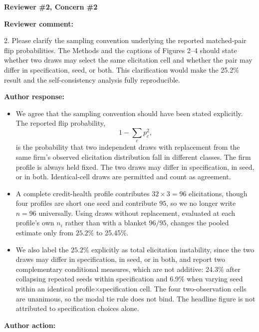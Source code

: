 \documentclass[11pt]{article}
\newcommand{\rvcomment}[1]{{\color{ReviewerGreen}#1}}
\newcommand{\concern}[1]{\textbf{\color{ReviewerGreen}#1}}
\begin{document}
\vspace{4pt}

\concern{Reviewer \#2, Concern \#2}

\concern{Reviewer comment:}

\rvcomment{2. Please clarify the sampling convention underlying the reported matched-pair flip
probabilities. The Methods and the captions of Figures 2--4 should state whether two draws may
select the same elicitation cell and whether the pair may differ in specification, seed, or both.
This clarification would make the 25.2\% result and the self-consistency analysis fully
reproducible.}

\textbf{Author response:}

\begin{itemize}
\item We agree that the sampling convention should have been stated explicitly. The reported flip
probability,
\[
1-\sum_c p_c^2,
\]
is the probability that two independent draws with replacement from the same firm's observed
elicitation distribution fall in different classes. The firm profile is always held fixed. The two draws may differ in
specification, in seed, or in both. Identical-cell draws are permitted and count as agreement.
\item A complete credit-health profile contributes $32\times3=96$ elicitations, though four profiles are short one seed and contribute $95$, so we no longer write $n=96$ universally. Using draws without replacement, evaluated at each profile's own $n_i$ rather than with a blanket $96/95$, changes the pooled estimate only from $25.2\%$ to 25.45\%.
\item We also label the $25.2\%$ explicitly as total elicitation instability, since the two draws may differ in specification, in seed, or in both, and report two complementary conditional measures, which are not additive: 24.3\% after collapsing repeated seeds within specification and 6.9\% when varying seed within an identical profile$\times$specification cell. The four two-observation cells are unanimous, so the modal tie rule does not bind. The headline figure is not attributed to specification choices alone.
\end{itemize}

\textbf{Author action:}
\end{document}

